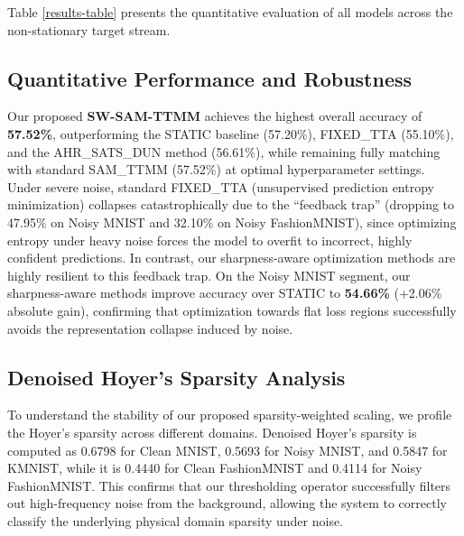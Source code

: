 \documentclass{article}
\theoremstyle{plain}
\theoremstyle{definition}
\theoremstyle{remark}
\begin{document}
Table \ref{results-table} presents the quantitative evaluation of all models across the non-stationary target stream.

\subsection{Quantitative Performance and Robustness}
Our proposed \textbf{SW-SAM-TTMM} achieves the highest overall accuracy of \textbf{57.52\%}, outperforming the STATIC baseline (57.20\%), FIXED\_TTA (55.10\%), and the AHR\_SATS\_DUN method (56.61\%), while remaining fully matching with standard SAM\_TTMM (57.52\%) at optimal hyperparameter settings.
Under severe noise, standard FIXED\_TTA (unsupervised prediction entropy minimization) collapses catastrophically due to the ``feedback trap'' (dropping to 47.95\% on Noisy MNIST and 32.10\% on Noisy FashionMNIST), since optimizing entropy under heavy noise forces the model to overfit to incorrect, highly confident predictions.
In contrast, our sharpness-aware optimization methods are highly resilient to this feedback trap. On the Noisy MNIST segment, our sharpness-aware methods improve accuracy over STATIC to \textbf{54.66\%} (+2.06\% absolute gain), confirming that optimization towards flat loss regions successfully avoids the representation collapse induced by noise.

\subsection{Denoised Hoyer's Sparsity Analysis}
To understand the stability of our proposed sparsity-weighted scaling, we profile the Hoyer's sparsity across different domains. Denoised Hoyer's sparsity is computed as 0.6798 for Clean MNIST, 0.5693 for Noisy MNIST, and 0.5847 for KMNIST, while it is 0.4440 for Clean FashionMNIST and 0.4114 for Noisy FashionMNIST. This confirms that our thresholding operator successfully filters out high-frequency noise from the background, allowing the system to correctly classify the underlying physical domain sparsity under noise.
\end{document}
